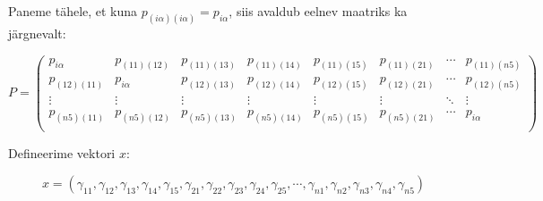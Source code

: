 \documentclass[a4paper]{article}
\newenvironment{tightcenter}{%
  \setlength\topsep{0pt}
  \setlength\parskip{0pt}
  \begin{center}
}{%
  \end{center}
}
\begin{document}
Paneme tähele, et kuna $p_{(i \alpha)( i \alpha)} = p_{i \alpha}$, siis avaldub eelnev maatriks ka järgnevalt:

\begin{tightcenter}
\begin{equation*}
P =
\begin{pmatrix}
p_{i \alpha}&p_{(11)(12)}&p_{(11)(13)}&p_{(11)(14)}&p_{(11)(15)}&p_{(11)(21)}&\cdots&p_{(11)(n5)} \\
p_{(12)(11)}&p_{i \alpha}&p_{(12)(13)}&p_{(12)(14)}&p_{(12)(15)}&p_{(12)(21)}&\cdots&p_{(12)(n5)} \\
\vdots&\vdots&\vdots&\vdots&\vdots&\vdots&\ddots&\vdots \\
p_{(n5)(11)}&p_{(n5)(12)}&p_{(n5)(13)}&p_{(n5)(14)}&p_{(n5)(15)}&p_{(n5)(21)}&\cdots&p_{i \alpha}\\
\end{pmatrix} 
\end{equation*}
\end{tightcenter}


Defineerime  vektori $x$:

\begin{tightcenter}
\begin{equation*}
x = (\gamma_{11},\gamma_{12},\gamma_{13} ,\gamma_{14},\gamma_{15},\gamma_{21},\gamma_{22},\gamma_{23},\gamma_{24},\gamma_{25}, \cdots ,\gamma_{n1},\gamma_{n2},\gamma_{n3},\gamma_{n4},\gamma_{n5})
\end{equation*}
\end{tightcenter}
\end{document}
